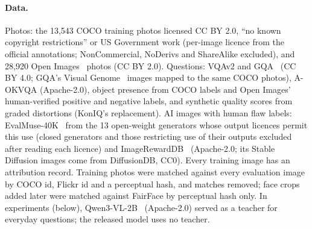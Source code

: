 \documentclass[10pt]{article}
\begin{document}
\paragraph{Data.} Photos: the 13{,}543 COCO training photos licensed CC BY 2.0, ``no known copyright restrictions'' or US Government work (per-image licence from the official annotations; NonCommercial, NoDerivs and ShareAlike excluded), and 28{,}920 Open Images~\cite{openimages2020} photos (CC BY 2.0). Questions: VQAv2 and GQA~\cite{gqa2019} (CC BY 4.0; GQA's Visual Genome~\cite{visualgenome2017} images mapped to the same COCO photos), A-OKVQA (Apache-2.0), object presence from COCO labels and Open Images' human-verified positive and negative labels, and synthetic quality scores from graded distortions (KonIQ's replacement). AI images with human flaw labels: EvalMuse-40K~\cite{evalmuse2024} from the 13 open-weight generators whose output licences permit this use (closed generators and those restricting use of their outputs excluded after reading each licence) and ImageRewardDB~\cite{imagereward2023} (Apache-2.0; its Stable Diffusion images come from DiffusionDB, CC0). Every training image has an attribution record. Training photos were matched against every evaluation image by COCO id, Flickr id and a perceptual hash, and matches removed; face crops added later were matched against FairFace by perceptual hash only. In experiments (below), Qwen3-VL-2B~\cite{qwen3vl} (Apache-2.0) served as a teacher for everyday questions; the released model uses no teacher.
\end{document}
